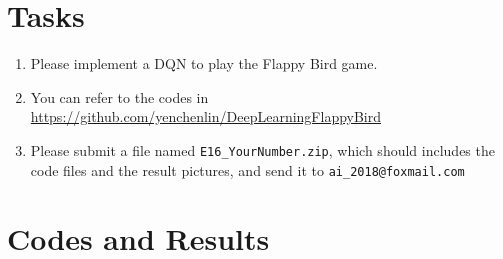 \documentclass[a4paper, 11pt]{article}
\begin{document}
\section{Tasks}
\begin{enumerate}
	\item Please implement a DQN to play the Flappy Bird game.
	\item You can refer to the codes in \url{https://github.com/yenchenlin/DeepLearningFlappyBird}
	\item Please submit a file named \texttt{E16\_YourNumber.zip}, which should includes the code files and the result pictures, and send it to \texttt{ai\_2018@foxmail.com}
\end{enumerate}
\section{Codes and Results}
\end{document}

